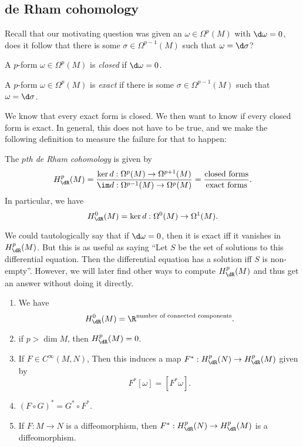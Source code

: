 \documentclass[a4paper]{article}
\begin{document}
\subsection{de Rham cohomology}
Recall that our motivating question was given an $\omega \in \Omega^p(M)$ with $\d \omega = 0$, does it follow that there is some $\sigma \in \Omega^{p - 1}(M)$ such that $\omega = \d \sigma$?

\begin{defi}
  A $p$-form $\omega \in \Omega^p(M)$ is \emph{closed} if $\d \omega = 0$.
\end{defi}

\begin{defi}
  A $p$-form $\omega \in \Omega^p(M)$ is \emph{exact} if there is some $\sigma \in \Omega^{p - 1}(M)$ such that $\omega = \d \sigma$.
\end{defi}

We know that every exact form is closed. We then want to know if every closed form is exact. In general, this does not have to be true, and we make the following definition to measure the failure for that to happen:

\begin{defi}
  The \emph{$p$th de Rham cohomology} is given by
  \[
    H^p_\dR (M) = \frac{\ker d: \Omega^p(M) \to \Omega^{p + 1}(M)}{\im d: \Omega^{p - 1}(M) \to \Omega^p(M)} = \frac{\text{closed forms}}{\text{exact forms}}.
  \]
  In particular, we have
  \[
    H^0_{\dR}(M) = \ker d: \Omega^0(M) \to \Omega^1(M).
  \]
\end{defi}

We could tautologically say that if $\d \omega = 0$, then it is exact iff it vanishes in $H^p_{\dR}(M)$. But this is as useful as saying ``Let $S$ be the set of solutions to this differential equation. Then the differential equation has a solution iff $S$ is non-empty''. However, we will later find other ways to compute $H^p_{\dR}(M)$ and thus get an answer without doing it directly.

\begin{prop}\leavevmode
  \begin{enumerate}
    \item We have
      \[
        H_{\dR}^0(M) = \R^{\text{number of connected components}}.
      \]
    \item if $p > \dim M$, then $H^p_{\dR}(M) = 0$.
    \item If $F \in C^\infty(M, N)$, Then this induces a map $F^*: H^p_\dR(N) \to H^p_\dR(M)$ given by
      \[
        F^*[\omega] = [F^* \omega].
      \]
    \item $(F \circ G)^* = G^* \circ F^*$.
    \item If $F: M \to N$ is a diffeomorphism, then $F^*: H^p_{\dR}(N) \to H^p_{\dR}(M)$ is a diffeomorphism.
  \end{enumerate}
\end{prop}
\end{document}
